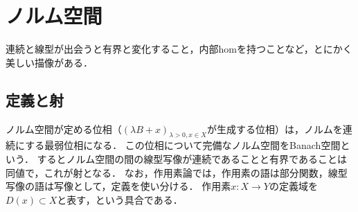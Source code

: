 \documentclass[uplatex,dvipdfmx]{jsreport}
\begin{document}
\section{ノルム空間}

\begin{tcolorbox}[colframe=ForestGreen, colback=ForestGreen!10!white,breakable,colbacktitle=ForestGreen!40!white,coltitle=black,fonttitle=\bfseries\sffamily,
title=]
    連続と線型が出会うと有界と変化すること，内部homを持つことなど，とにかく美しい描像がある．
\end{tcolorbox}

\subsection{定義と射}

\begin{tcolorbox}[colframe=ForestGreen, colback=ForestGreen!10!white,breakable,colbacktitle=ForestGreen!40!white,coltitle=black,fonttitle=\bfseries\sffamily,
title=]
    ノルム空間が定める位相（$(\lambda B+x)_{\lambda>0,x\in X}$が生成する位相）は，ノルムを連続にする最弱位相になる．
    この位相について完備なノルム空間をBanach空間という．
    するとノルム空間の間の線型写像が連続であることと有界であることは同値で，これが射となる．
    なお，作用素論では，作用素の語は部分関数，線型写像の語は写像として，定義を使い分ける．
    作用素$x:X\to Y$の定義域を$D(x)\subset X$と表す，という具合である．
\end{tcolorbox}
\end{document}
